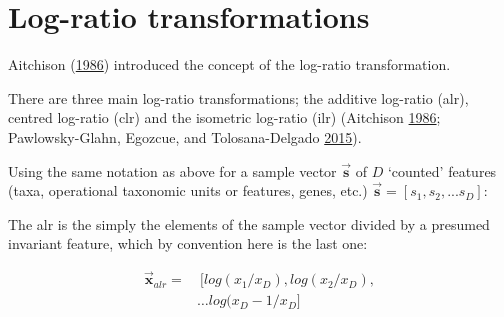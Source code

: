 \documentclass[onecolumn]{book}
\theoremstyle{definition}
\theoremstyle{definition}
\theoremstyle{definition}
\theoremstyle{remark}
\begin{document}
\begin{table}[!h]
\caption{Example calculation of MR normalization}
\centering
{}
\label{tab:des}
\end{table}

\hypertarget{log-ratio-transformations}{%
\section{Log-ratio transformations}\label{log-ratio-transformations}}

Aitchison (\protect\hyperlink{ref-Aitchison:1986}{1986}) introduced the
concept of the log-ratio transformation.

There are three main log-ratio transformations; the additive log-ratio
(alr), centred log-ratio (clr) and the isometric log-ratio (ilr)
(Aitchison \protect\hyperlink{ref-Aitchison:1986}{1986};
Pawlowsky-Glahn, Egozcue, and Tolosana-Delgado
\protect\hyperlink{ref-pawlowsky2015modeling}{2015}).

Using the same notation as above for a sample vector
\(\vec{\textbf{s}}\) of \(D\) `counted' features (taxa, operational
taxonomic units or features, genes, etc.)
\(\vec{\textbf{s}}=[s_1, s_2, ... s_D]\):

The alr is the simply the elements of the sample vector divided by a
presumed invariant feature, which by convention here is the last one:

\begin{equation}
\begin{aligned}
 \vec{\textbf{x}}_{alr}= &\ [log(x_1/x_D), log(x_2/x_D), \\
 & \ldots log(x_D-1/x_D]
\end{aligned}
 \label{eq:alr}
\end{equation}
\end{document}
